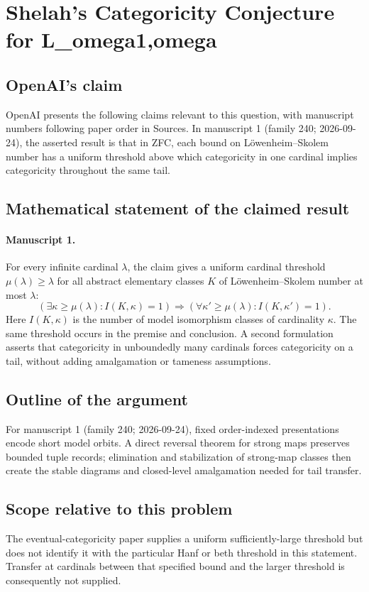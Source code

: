 \documentclass[11pt]{article}
\begin{document}
\section*{Shelah's Categoricity Conjecture for L\_omega1,omega}

\subsection{OpenAI's claim}
OpenAI presents the following claims relevant to this question, with manuscript numbers following paper order in Sources. In manuscript 1 (family 240; 2026-09-24), the asserted result is that in ZFC, each bound on L\"owenheim--Skolem number has a uniform threshold above which categoricity in one cardinal implies categoricity throughout the same tail.

\subsection{Mathematical statement of the claimed result}
\paragraph{Manuscript 1.}
For every infinite cardinal $\lambda$, the claim gives a uniform cardinal threshold $\mu(\lambda)\ge\lambda$ for all abstract elementary classes $K$ of L\"owenheim--Skolem number at most $\lambda$:
\[
 (\exists\kappa\ge\mu(\lambda):I(K,\kappa)=1)
 \Longrightarrow(\forall\kappa'\ge\mu(\lambda):I(K,\kappa')=1).
\]
Here $I(K,\kappa)$ is the number of model isomorphism classes of cardinality $\kappa$. The same threshold occurs in the premise and conclusion. A second formulation asserts that categoricity in unboundedly many cardinals forces categoricity on a tail, without adding amalgamation or tameness assumptions.

\subsection{Outline of the argument}
For manuscript 1 (family 240; 2026-09-24), fixed order-indexed presentations encode short model orbits. A direct reversal theorem for strong maps preserves bounded tuple records; elimination and stabilization of strong-map classes then create the stable diagrams and closed-level amalgamation needed for tail transfer.

\subsection{Scope relative to this problem}
The eventual-categoricity paper supplies a uniform sufficiently-large threshold but does not identify it with the particular Hanf or beth threshold in this statement. Transfer at cardinals between that specified bound and the larger threshold is consequently not supplied.
\end{document}
